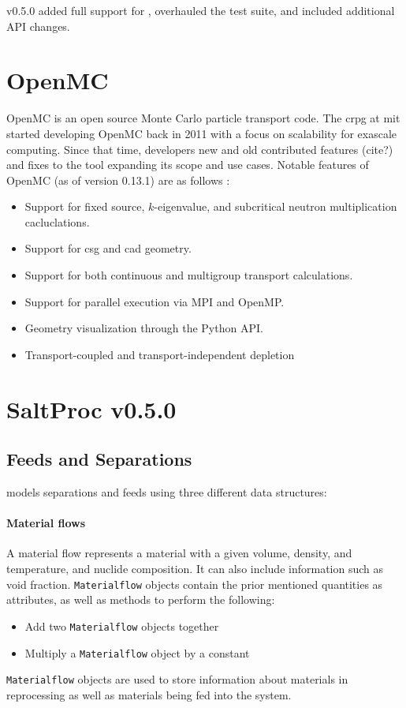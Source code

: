 \SaltProc v0.5.0 added full support for \OpenMC, overhauled the test suite, and included additional API changes.


\section{OpenMC}%
\label{sub:openmc}

OpenMC \cite{romano_jpenmc_2015} is an open source Monte Carlo particle
transport code. The \Gls{crpg} at \Gls{mit} started developing OpenMC back in
2011 with a focus on scalability for exascale computing. Since that time,
developers new and old contributed features (cite?) and fixes to the tool
expanding its scope and use cases. Notable features of OpenMC (as of version
0.13.1) are as follows \cite{homepage_openmc_2022}:
\begin{itemize}
    \item Support for fixed source, $k$-eigenvalue, and subcritical neutron multiplication cacluclations.
    \item Support for \Gls{csg} and \Gls{cad} geometry.
    \item Support for both continuous and multigroup transport calculations.
    \item Support for parallel execution via MPI and OpenMP.
    \item Geometry visualization through the Python API.
    \item Transport-coupled and transport-independent depletion
\end{itemize}

\section{SaltProc v0.5.0}
\label{sec:saltproc-detail}

\subsection{Feeds and Separations}
\SaltProc models separations and feeds using three different data structures:


\paragraph{Material flows}
    A material flow represents a material with a given
    volume, density, and temperature, and nuclide composition.
    It can also include information such as void fraction. \verb.Materialflow.
    objects contain the prior mentioned quantities as attributes, as well as
    methods to perform the following:
    \begin{itemize}
        \item Add two \verb.Materialflow. objects together
        \item Multiply a \verb.Materialflow. object by a constant
    \end{itemize}
    \verb.Materialflow. objects are used to store information about materials
    in reprocessing as well as materials being fed into the system.

